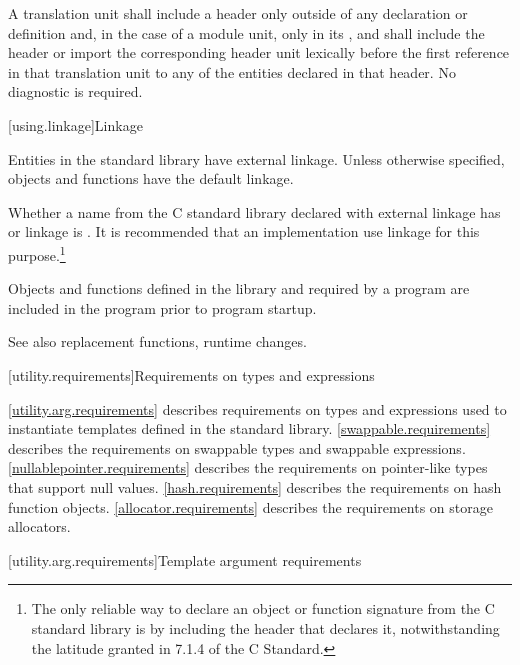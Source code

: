 \pnum
A translation unit shall include a header only outside of any
%
declaration or definition and,
in the case of a module unit,
only in its , and
shall include the header or import the corresponding header unit lexically
before the first reference in that translation unit to any of the entities
declared in that header. No diagnostic is required.

[using.linkage]{Linkage}

\pnum
Entities in the \Cpp{} standard library have external linkage.
Unless otherwise specified, objects and functions have the default
linkage.

\pnum
{}%
Whether a name from the C standard library declared with
external linkage has
%
%
%
or
%
linkage is . It is recommended that an
implementation use
linkage for this purpose.\footnote{The only reliable way to declare an object or
function signature from the C standard library is by including the header that
declares it, notwithstanding the latitude granted in 7.1.4 of the C
Standard.}

\pnum
Objects and functions
defined in the library and required by a \Cpp{} program are included in
the program prior to program startup.

%
\pnum
See also
replacement functions,
runtime changes.

[utility.requirements]{Requirements on types and expressions}

\pnum
\ref{utility.arg.requirements}
describes requirements on types and expressions used to instantiate templates
defined in the \Cpp{} standard library.
\ref{swappable.requirements} describes the requirements on swappable types and
swappable expressions.
\ref{nullablepointer.requirements} describes the requirements on pointer-like
types that support null values.
\ref{hash.requirements} describes the requirements on hash function objects.
\ref{allocator.requirements} describes the requirements on storage
allocators.

[utility.arg.requirements]{Template argument requirements}

